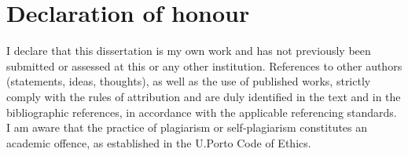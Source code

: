 \chapter*{Declaration of honour}

\begin{center}
\end{center}
I declare that this dissertation is my own work and has not previously been 
submitted or assessed at this or any other institution.
References to other authors (statements, ideas, thoughts), as well as the use 
of published works, strictly comply with the rules of attribution and are 
duly identified in the text and in the bibliographic references, in 
accordance with the applicable referencing standards.
I am aware that the practice of plagiarism or self-plagiarism constitutes 
an academic offence, as established in the U.Porto Code of Ethics.


